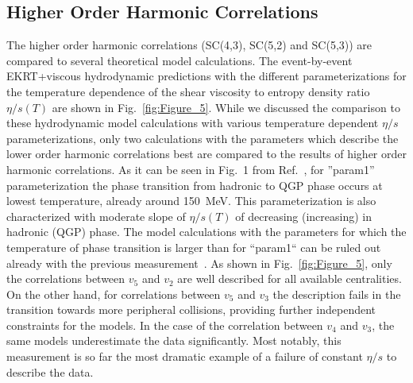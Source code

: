\subsection{Higher Order Harmonic Correlations}
\label{sec:theory_highorder}
The higher order harmonic correlations (SC(4,3), SC(5,2) and SC(5,3)) are compared to several theoretical model calculations. 
The event-by-event EKRT+viscous hydrodynamic predictions with the different parameterizations for the temperature dependence of the shear viscosity to entropy density ratio $\eta/s(T)$ are shown in Fig.~\ref{fig:Figure_5}. 
While we discussed the comparison to these hydrodynamic model calculations with various temperature dependent $\eta/s$ parameterizations, only two calculations with the parameters which describe the lower order harmonic correlations best are compared to the results of higher order harmonic correlations. 
As it can be seen in Fig.~1 from Ref.~\cite{Niemi:2015qia}, for ''param1'' parameterization the phase transition from hadronic to QGP phase occurs at lowest temperature, already around 150~MeV. This parameterization is also characterized with moderate slope of $\eta/s(T)$ of decreasing (increasing) in hadronic (QGP) phase.
The model calculations with the parameters for which the temperature of phase transition is larger than for ``param1`` can be ruled out already with the previous measurement~\cite{ALICE:2016kpq}.
As shown in Fig.~\ref{fig:Figure_5}, only the correlations between $v_5$ and $v_2$ are well described for all available centralities. 
On the other hand, for correlations between $v_5$ and $v_3$ the description fails in the transition towards more peripheral collisions, providing further independent constraints for the models.
In the case of the correlation between $v_4$ and $v_3$, the same models underestimate the data significantly.
Most notably, this measurement is so far the most dramatic example of a failure of constant $\eta/s$ to describe the data.

%

